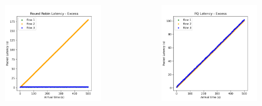 \documentclass[compress]{beamer}
\begin{document}
\begin{frame}
\begin{columns}
\begin{column}{0.32\textwidth}
\begin{figure}
                    \includegraphics[width=\textwidth]{../img/rr_excess}
                \end{figure}
            \end{column}
            \begin{column}{0.32\textwidth}
                \begin{figure}
                    \centering
                    \includegraphics[width=\textwidth]{../img/fq_excess}
                \end{figure}
            \end{column}
        \end{columns}
    \end{frame}
\end{document}
